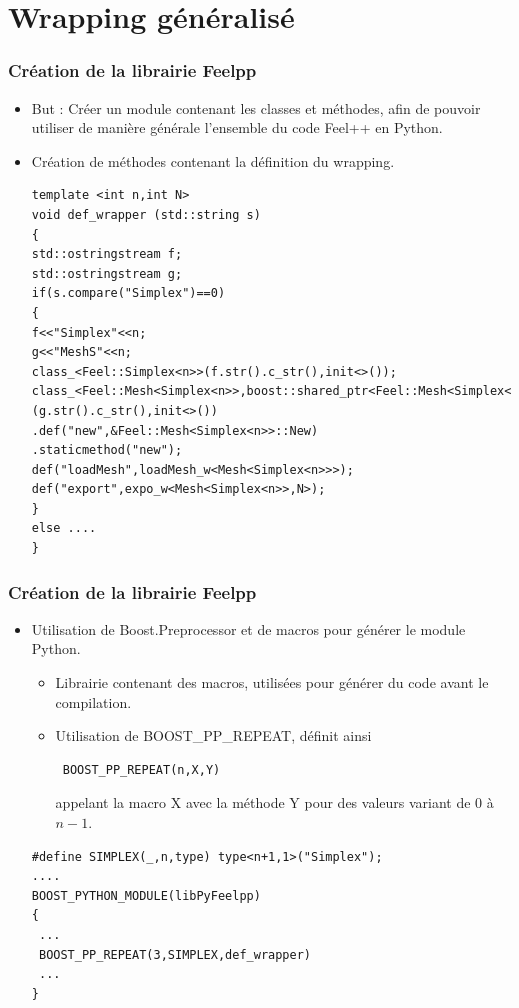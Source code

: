 \documentclass[french,10pt]{beamer}
\begin{document}
\section{Wrapping généralisé}

\begin{frame}[fragile]
\frametitle{Création de la librairie Feelpp}
\begin{itemize}
\item But : Créer un module contenant les classes et méthodes, afin de pouvoir utiliser de manière générale l'ensemble du code Feel++ en Python.
\item Création de méthodes contenant la définition du wrapping.
\begin{lstlisting}
template <int n,int N>
void def_wrapper (std::string s)
{
std::ostringstream f;
std::ostringstream g;
if(s.compare("Simplex")==0)
{
f<<"Simplex"<<n;
g<<"MeshS"<<n;
class_<Feel::Simplex<n>>(f.str().c_str(),init<>());
class_<Feel::Mesh<Simplex<n>>,boost::shared_ptr<Feel::Mesh<Simplex<n>>>,boost::noncopyable>(g.str().c_str(),init<>())
.def("new",&Feel::Mesh<Simplex<n>>::New)
.staticmethod("new");
def("loadMesh",loadMesh_w<Mesh<Simplex<n>>>);
def("export",expo_w<Mesh<Simplex<n>>,N>);
}
else ....
}
\end{lstlisting}
\end{itemize}
\end{frame}

\begin{frame}[fragile]
\frametitle{Création de la librairie Feelpp}
\begin{itemize}
\item Utilisation de Boost.Preprocessor et de macros pour générer le module Python.
\begin{itemize}
\item Librairie contenant des macros, utilisées pour générer du code avant le compilation.
\item Utilisation de BOOST\_PP\_REPEAT, définit ainsi
\begin{lstlisting}
 BOOST_PP_REPEAT(n,X,Y)
\end{lstlisting}
appelant la macro X  avec la méthode Y pour des valeurs variant de 0 à $n-1$. 
\end{itemize}
\begin{lstlisting}
#define SIMPLEX(_,n,type) type<n+1,1>("Simplex");
....
BOOST_PYTHON_MODULE(libPyFeelpp)
{
 ...
 BOOST_PP_REPEAT(3,SIMPLEX,def_wrapper)
 ...
}
\end{lstlisting} 
\end{itemize}
\end{frame}
\end{document}
